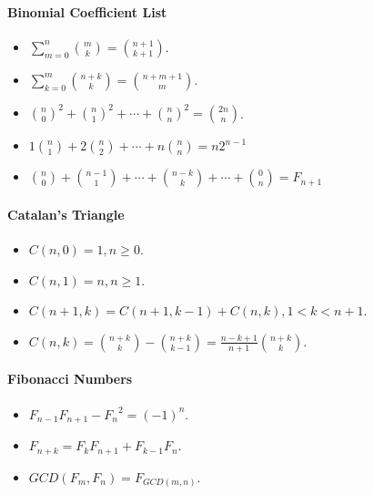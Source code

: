 \paragraph{Binomial Coefficient List}
\begin{itemize}
    \item $\sum_{m = 0}^n \binom m k = \binom {n + 1} {k + 1} $.
    \item $\sum_{k = 0}^m \binom {n + k} k = \binom {n + m + 1} m$.
    \item ${\binom n 0}^2 + {\binom n 1}^2 + \cdots + {\binom n n}^2 = \binom {2n} n$.
    \item $1 \binom n 1 + 2 \binom n 2 + \cdots + n \binom n n = n 2^{n-1} $
    \item $\binom n 0 + \binom {n-1} 1 + \cdots + \binom {n-k} k + \cdots + \binom 0 n = F_{n+1} $
\end{itemize}
\paragraph{Catalan's Triangle}
\begin{itemize}
	\item $C(n,0) = 1, n\ge0$.
	\item $C(n,1) = n, n\ge1$.
	\item $C(n+1,k) = C(n+1,k-1) + C(n,k), 1 < k < n + 1$.
	\item $C(n,k) = \binom {n+k} {k} - \binom {n+k} {k-1} = \frac{n-k+1}{n+1}\binom{n+k}{k}$.
\end{itemize}
\paragraph{Fibonacci Numbers}
\begin{itemize}
	\item $F_{n-1}F_{n+1} - {F_n}^2 = {(-1)}^n $.
	\item $F_{n+k} = F_kF_{n+1} + F_{k-1}F_n$.
	\item $GCD(F_m,F_n) = F_{GCD(m,n)}$.
\end{itemize}